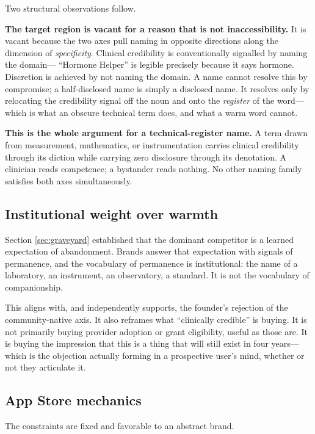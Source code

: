 \documentclass[11pt,a4paper]{article}
\begin{document}
Two structural observations follow.

\textbf{The target region is vacant for a reason that is not
inaccessibility.} It is vacant because the two axes pull naming in
opposite directions along the dimension of \emph{specificity}. Clinical
credibility is conventionally signalled by naming the domain---
``Hormone Helper'' is legible precisely because it says hormone.
Discretion is achieved by not naming the domain. A name cannot resolve
this by compromise; a half-disclosed name is simply a disclosed name.
It resolves only by relocating the credibility signal off the noun and
onto the \emph{register} of the word---which is what an obscure
technical term does, and what a warm word cannot.

\textbf{This is the whole argument for a technical-register name.} A
term drawn from measurement, mathematics, or instrumentation carries
clinical credibility through its diction while carrying zero
disclosure through its denotation. A clinician reads competence; a
bystander reads nothing. No other naming family satisfies both axes
simultaneously.

\subsection{Institutional weight over warmth}
\label{sec:institutional}

Section \ref{sec:graveyard} established that the dominant competitor is
a learned expectation of abandonment. Brands answer that expectation
with signals of permanence, and the vocabulary of permanence is
institutional: the name of a laboratory, an instrument, an observatory,
a standard. It is not the vocabulary of companionship.

This aligns with, and independently supports, the founder's rejection
of the community-native axis. It also reframes what ``clinically
credible'' is buying. It is not primarily buying provider adoption or
grant eligibility, useful as those are. It is buying the impression
that this is a thing that will still exist in four years---which is the
objection actually forming in a prospective user's mind, whether or not
they articulate it.

\subsection{App Store mechanics}
\label{sec:asomechanics}

The constraints are fixed and favorable to an abstract brand.
\end{document}
